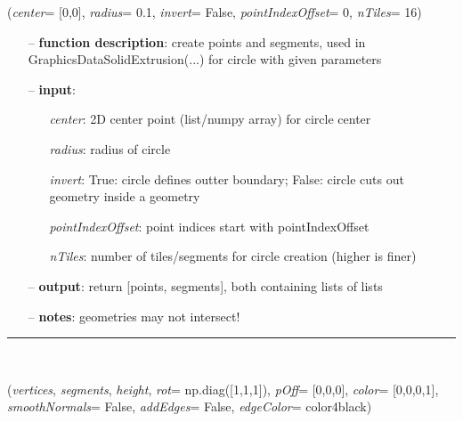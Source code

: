 \begin{itemize}[leftmargin=1.4cm]
\begin{itemize}[leftmargin=1.4cm]
\begin{itemize}[leftmargin=0.5cm]
\begin{itemize}[leftmargin=1.4cm]
\begin{itemize}[leftmargin=1.4cm]
\begin{itemize}[leftmargin=0.5cm]
\begin{itemize}[leftmargin=1.4cm]
\begin{itemize}[leftmargin=0.5cm]
\begin{flushleft}
\label{sec:graphicsDataUtilities:CirclePointsAndSegments}
({\it center}= [0,0], {\it radius}= 0.1, {\it invert}= False, {\it pointIndexOffset}= 0, {\it nTiles}= 16)
\end{flushleft}
\setlength{\itemindent}{0.7cm}
\begin{itemize}[leftmargin=0.7cm]
\item[--]
{\bf function description}: create points and segments, used in GraphicsDataSolidExtrusion(...) for circle with given parameters
\item[--]
{\bf input}: \vspace{-6pt}
\begin{itemize}[leftmargin=1.2cm]
\setlength{\itemindent}{-0.7cm}
\item[]{\it center}: 2D center point (list/numpy array) for circle center
\item[]{\it radius}: radius of circle
\item[]{\it invert}: True: circle defines outter boundary; False: circle cuts out geometry inside a geometry
\item[]{\it pointIndexOffset}: point indices start with pointIndexOffset
\item[]{\it nTiles}: number of tiles/segments for circle creation (higher is finer)
\end{itemize}
\item[--]
{\bf output}: return [points, segments], both containing lists of lists
\item[--]
{\bf notes}: geometries may not intersect!
\vspace{12pt}\end{itemize}
%
\noindent\rule{8cm}{0.75pt}\vspace{1pt} \\ 
\begin{flushleft}
\label{sec:graphicsDataUtilities:GraphicsDataSolidExtrusion}
({\it vertices}, {\it segments}, {\it height}, {\it rot}= np.diag([1,1,1]), {\it pOff}= [0,0,0], {\it color}= [0,0,0,1], {\it smoothNormals}= False, {\it addEdges}= False, {\it edgeColor}= color4black)
\end{flushleft}
\setlength{\itemindent}{0.7cm}
\begin{itemize}[leftmargin=0.7cm]

\end{itemize}
\end{itemize}
\end{itemize}
\end{itemize}
\end{itemize}
\end{itemize}
\end{itemize}
\end{itemize}
\end{itemize}
